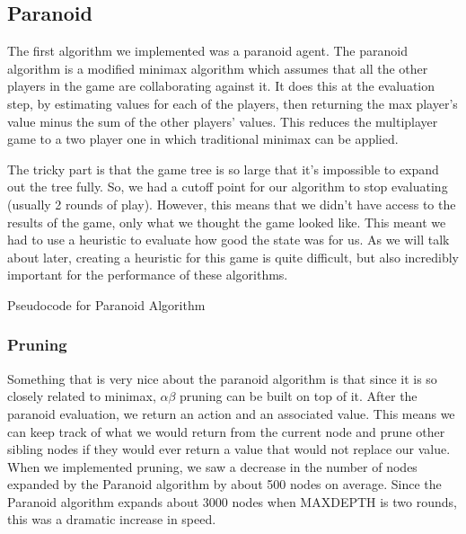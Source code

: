 \documentclass[11pt]{article}
\begin{document}
\subsection{Paranoid}

The first algorithm we implemented was a paranoid agent. The paranoid algorithm is a modified minimax algorithm which assumes that all the other players in the game are collaborating against it. It does this at the evaluation step, by estimating values for each of the players, then returning the max player's value minus the sum of the other players' values. This reduces the multiplayer game to a two player one in which traditional minimax can be applied.

The tricky part is that the game tree is so large that it's impossible to expand out the tree fully. So, we had a cutoff point for our algorithm to stop evaluating (usually 2 rounds of play). However, this means that we didn't have access to the results of the game, only what we thought the game looked like. This meant we had to use a heuristic to evaluate how good the state was for us. As we will talk about later, creating a heuristic for this game is quite difficult, but also incredibly important for the performance of these algorithms.

\begin{algorithm}
  \begin{algorithmic}
	\EndIf
		\EndFor
	\EndIf
		\EndFor
	\EndIf
    \EndProcedure{}
  \end{algorithmic}
  \caption{Pseudocode for Paranoid Algorithm}
\end{algorithm}

\subsubsection{Pruning}

Something that is very nice about the paranoid algorithm is that since it is so closely related to minimax, $\alpha\beta$ pruning can be built on top of it. After the paranoid evaluation, we return an action and an associated value. This means we can keep track of what we would return from the current node and prune other sibling nodes if they would ever return a value that would not replace our value. When we implemented pruning, we saw a decrease in the number of nodes expanded by the Paranoid algorithm by about 500 nodes on average. Since the Paranoid algorithm expands about 3000 nodes when MAXDEPTH is two rounds, this was a dramatic increase in speed.
\end{document}
